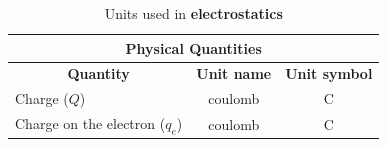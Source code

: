 \begin{table}[H]
\begin{center}
\begin{tabular}{|l|c|c|}\hline \hline 
\multicolumn{3}{|c|}{\textbf{Physical Quantities}}\\ \hline \hline
\multicolumn{1}{|c|}{\textbf{Quantity}} & \textbf{Unit name} & \textbf{Unit symbol}\\ \hline
Charge ($Q$) & coulomb & C \\ \hline
Charge on the electron ($q_{e}$) & coulomb & C \\ \hline
\end{tabular}
\end{center}
\caption{Units used in \textbf{electrostatics} }
\label{table:electrostatics::units}
\end{table}

